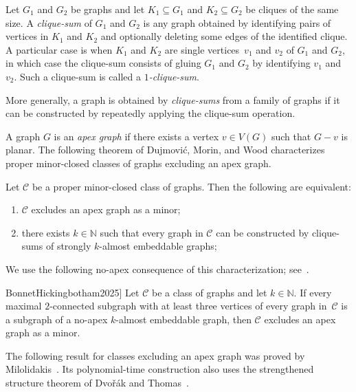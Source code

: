 \documentclass[1p,number,11pt]{elsarticle}
\theoremstyle{plain}
\newcommand{\Cc}{\mathscr{C}}
\begin{document}
Let $G_1$ and $G_2$ be graphs and let $K_1\subseteq G_1$ and $K_2\subseteq G_2$ be cliques of the same size.
A \emph{clique-sum} of $G_1$ and $G_2$ is any graph obtained by identifying pairs of vertices in $K_1$ and $K_2$ and optionally deleting some edges of the identified clique. 
A particular case is when $K_1$ and $K_2$ are single vertices~$v_1$ and $v_2$ of $G_1$ and $G_2$, in which case the clique-sum consists of gluing $G_1$ and $G_2$ by identifying $v_1$ and $v_2$. 
Such a clique-sum is called a \emph{$1$-clique-sum}.

More generally, a graph is obtained by \emph{clique-sums} from a family of graphs if it can be constructed by repeatedly applying the clique-sum operation.

A graph $G$ is an \emph{apex graph} if there exists a vertex $v\in V(G)$ such that $G-v$ is planar.
The following theorem of Dujmovi\'{c}, Morin, and Wood characterizes proper minor-closed classes of graphs excluding an apex graph.


\begin{theorem}
\label{thm:dmw}
Let $\Cc$ be a proper minor-closed class of graphs.
Then the following are equivalent:
\begin{enumerate}[nosep]
    \item $\Cc$ excludes an apex graph as a minor;
    \item there exists $k\in \mathbb N$ such that every graph in $\Cc$ can be constructed by clique-sums of strongly $k$-almost embeddable graphs;
\end{enumerate}
\end{theorem}

We use the following no-apex consequence of this characterization; see~\cite[Theorem~2.2]{BonnetHickingbotham2025}.

\begin{corollary}[\cite[Theorem~2.2]{BonnetHickingbotham2025}]
\label{cor:bloc}
Let $\Cc$ be a class of graphs and let $k\in\mathbb N$.
If every maximal $2$-connected subgraph with at least three vertices of every
graph in~$\Cc$ is a subgraph of a no-apex $k$-almost embeddable graph, then
$\Cc$ excludes an apex graph as a minor.
\end{corollary}

The following result for classes excluding an apex graph was proved by
Milolidakis~\cite{MilolidakisThesis}. Its polynomial-time construction
also uses the strengthened structure theorem of Dvo\v{r}\'ak and
Thomas~\cite{dvorak2014list}.
\end{document}
